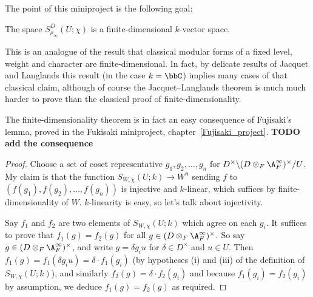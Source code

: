 The point of this miniproject is the following goal:

\begin{theorem}
  \label{TotallyDefiniteQuaternionAlgebra.AutomorphicForm.finiteDimensional}
  The space $S_{\rho_\infty}^D(U;\chi)$ is a finite-dimensional $k$-vector space.
\end{theorem}

This is an analogue of the result that classical modular forms of a fixed
level, weight and character are finite-dimensional. In fact, by delicate results
of Jacquet and Langlands this result (in the case $k=\bbC$) implies many cases of that classical claim,
although of course the Jacquet--Langlands theorem is much much harder to prove than the classical
proof of finite-dimensionality.

The finite-dimensionality theorem is in fact an easy consequence of Fujisaki's lemma,
proved in the Fukisaki miniproject, chapter~\ref{Fujisaki_project}. {\bf TODO add the
consequence}

\begin{proof}
  Choose a set of coset representative $g_1,g_2,\ldots,g_n$ for
  $D^\times\backslash(D\otimes_F\A_F^\infty)^\times/U$. My claim is that
  the function $S_{W,\chi}(U;k)\to W^n$ sending $f$ to $(f(g_1),f(g_2),\ldots,f(g_n))$
  is injective and $k$-linear, which suffices by finite-dimensionality of $W$.
  $k$-linearity is easy, so let's talk about injectivity.

  Say $f_1$ and $f_2$ are two elements of $S_{W,\chi}(U;k)$ which agree on
  each $g_i$. It suffices to prove that $f_1(g)=f_2(g)$ for all
  $g\in(D\otimes_F\A_F^\infty)^\times$. So say $g\in(D\otimes_F\A_F^\infty)^\times$,
  and write $g=\delta g_iu$ for $\delta \in D^\times$ and $u\in U$.
  Then $f_1(g)=f_1(\delta g_iu)=\delta\cdot f_1(g_i)$ (by hypotheses (i) and (iii)
  of the definition of $S_{W,\chi}(U;k)$), and similarly $f_2(g)=\delta\cdot f_2(g_i)$
  and because $f_1(g_i)=f_2(g_i)$ by assumption, we deduce $f_1(g)=f_2(g)$ as required.
\end{proof}

